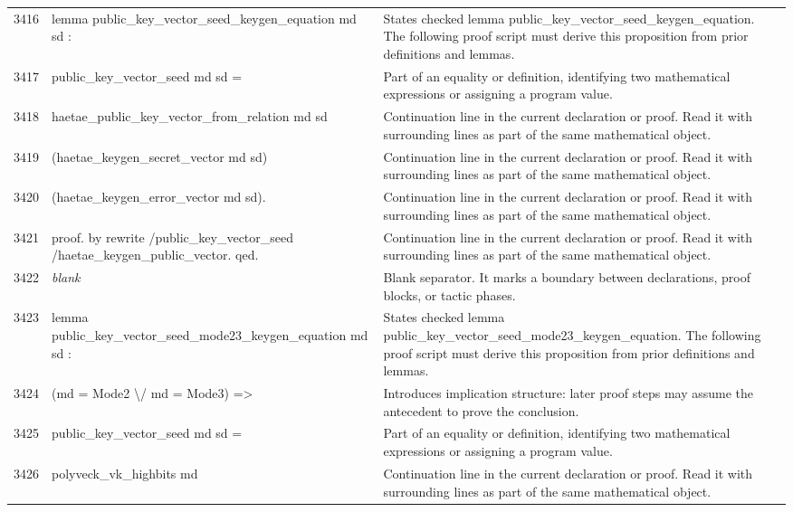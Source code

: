 \documentclass[10pt]{article}
\begin{document}
\begin{longtable}{r L{0.53\textwidth} L{0.37\textwidth}}
3416 & {\ttfamily\scriptsize lemma public\_key\_vector\_seed\_keygen\_equation md sd :} & States checked lemma public\_key\_vector\_seed\_keygen\_equation.  The following proof script must derive this proposition from prior definitions and lemmas. \\
3417 & {\ttfamily\scriptsize   public\_key\_vector\_seed md sd =} & Part of an equality or definition, identifying two mathematical expressions or assigning a program value. \\
3418 & {\ttfamily\scriptsize   haetae\_public\_key\_vector\_from\_relation md sd} & Continuation line in the current declaration or proof.  Read it with surrounding lines as part of the same mathematical object. \\
3419 & {\ttfamily\scriptsize     (haetae\_keygen\_secret\_vector md sd)} & Continuation line in the current declaration or proof.  Read it with surrounding lines as part of the same mathematical object. \\
3420 & {\ttfamily\scriptsize     (haetae\_keygen\_error\_vector md sd).} & Continuation line in the current declaration or proof.  Read it with surrounding lines as part of the same mathematical object. \\
3421 & {\ttfamily\scriptsize proof. by rewrite /public\_key\_vector\_seed /haetae\_keygen\_public\_vector. qed.} & Continuation line in the current declaration or proof.  Read it with surrounding lines as part of the same mathematical object. \\
3422 & {\ttfamily\scriptsize \emph{blank}} & Blank separator.  It marks a boundary between declarations, proof blocks, or tactic phases. \\
3423 & {\ttfamily\scriptsize lemma public\_key\_vector\_seed\_mode23\_keygen\_equation md sd :} & States checked lemma public\_key\_vector\_seed\_mode23\_keygen\_equation.  The following proof script must derive this proposition from prior definitions and lemmas. \\
3424 & {\ttfamily\scriptsize   (md = Mode2 \textbackslash{}/ md = Mode3) =>} & Introduces implication structure: later proof steps may assume the antecedent to prove the conclusion. \\
3425 & {\ttfamily\scriptsize   public\_key\_vector\_seed md sd =} & Part of an equality or definition, identifying two mathematical expressions or assigning a program value. \\
3426 & {\ttfamily\scriptsize   polyveck\_vk\_highbits md} & Continuation line in the current declaration or proof.  Read it with surrounding lines as part of the same mathematical object. \\

\end{longtable}
\end{document}
